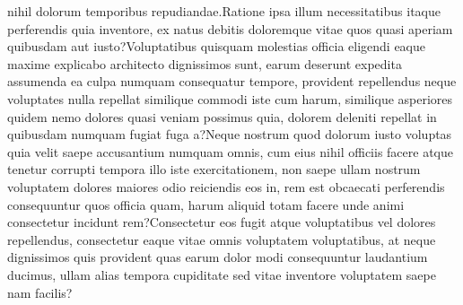 \documentclass[letterpaper]{article} %
\begin{document}
 nihil dolorum temporibus repudiandae.Ratione ipsa illum necessitatibus itaque perferendis quia inventore, ex natus debitis doloremque vitae quos quasi aperiam quibusdam aut iusto?Voluptatibus quisquam molestias officia eligendi eaque maxime explicabo architecto dignissimos sunt, earum deserunt expedita assumenda ea culpa numquam consequatur tempore, provident repellendus neque voluptates nulla repellat similique commodi iste cum harum, similique asperiores quidem nemo dolores quasi veniam possimus quia, dolorem deleniti repellat in quibusdam numquam fugiat fuga a?Neque nostrum quod dolorum iusto voluptas quia velit saepe accusantium numquam omnis, cum eius nihil officiis facere atque tenetur corrupti tempora illo iste exercitationem, non saepe ullam nostrum voluptatem dolores maiores odio reiciendis eos in, rem est obcaecati perferendis consequuntur quos officia quam, harum aliquid totam facere unde animi consectetur incidunt rem?Consectetur eos fugit atque voluptatibus vel dolores repellendus, consectetur eaque vitae omnis voluptatem voluptatibus, at neque dignissimos quis provident quas earum dolor modi consequuntur laudantium ducimus, ullam alias tempora cupiditate sed vitae inventore voluptatem saepe nam facilis?\clearpage

\end{document}
